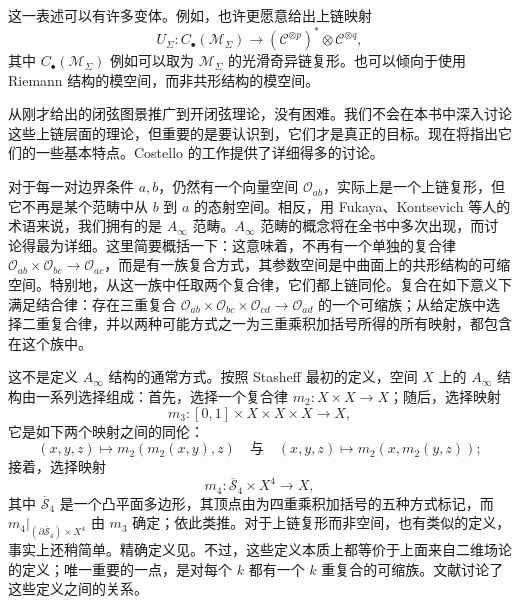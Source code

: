 这一表述可以有许多变体。例如，也许更愿意给出上链映射
\begin{equation}\label{eq:2.27}
U_\Sigma\colon C_\bullet(\mathcal{M}_\Sigma)\longrightarrow(\mathcal{C}^{\otimes p})^*\otimes\mathcal{C}^{\otimes q},
\end{equation}
其中 $C_\bullet(\mathcal{M}_\Sigma)$ 例如可以取为 $\mathcal{M}_\Sigma$ 的光滑奇异链复形。也可以倾向于使用 Riemann 结构的模空间，而非共形结构的模空间。

从刚才给出的闭弦图景推广到开闭弦理论，没有困难。我们不会在本书中深入讨论这些上链层面的理论，但重要的是要认识到，它们才是真正的目标。现在将指出它们的一些基本特点。Costello 的工作提供了详细得多的讨论。

对于每一对边界条件 $a,b$，仍然有一个向量空间 $\mathcal{O}_{ab}$，实际上是一个上链复形，但它不再是某个范畴中从 $b$ 到 $a$ 的态射空间。相反，用 Fukaya、Kontsevich 等人的术语来说，我们拥有的是 $A_\infty$ 范畴。$A_\infty$ 范畴的概念将在全书中多次出现，而讨论得最为详细。这里简要概括一下：这意味着，不再有一个单独的复合律 $\mathcal{O}_{ab}\times\mathcal{O}_{bc}\to\mathcal{O}_{ac}$，而是有一族复合方式，其参数空间是中曲面上的共形结构的可缩空间。特别地，从这一族中任取两个复合律，它们都上链同伦。复合在如下意义下满足结合律：存在三重复合 $\mathcal{O}_{ab}\times\mathcal{O}_{bc}\times\mathcal{O}_{cd}\to\mathcal{O}_{ad}$ 的一个可缩族；从给定族中选择二重复合律，并以两种可能方式之一为三重乘积加括号所得的所有映射，都包含在这个族中。

\begin{note}[2.5]\label{note:2.5}
这不是定义 $A_\infty$ 结构的通常方式。按照 Stasheff 最初的定义，空间 $X$ 上的 $A_\infty$ 结构由一系列选择组成：首先，选择一个复合律 $m_2\colon X\times X\to X$；随后，选择映射
\[
m_3\colon[0,1]\times X\times X\times X\longrightarrow X,
\]
它是如下两个映射之间的同伦：
\[
(x,y,z)\longmapsto m_2(m_2(x,y),z)\quad\text{与}\quad
(x,y,z)\longmapsto m_2(x,m_2(y,z));
\]
接着，选择映射
\[
m_4\colon\overline{\mathcal{S}}_4\times X^4\longrightarrow X,
\]
其中 $\overline{\mathcal{S}}_4$ 是一个凸平面多边形，其顶点由为四重乘积加括号的五种方式标记，而 $m_4|_{(\partial\overline{\mathcal{S}}_4)\times X^4}$ 由 $m_3$ 确定；依此类推。对于上链复形而非空间，也有类似的定义，事实上还稍简单。精确定义见。不过，这些定义本质上都等价于上面来自二维场论的定义；唯一重要的一点，是对每个 $k$ 都有一个 $k$ 重复合的可缩族。文献讨论了这些定义之间的关系。
\end{note}

